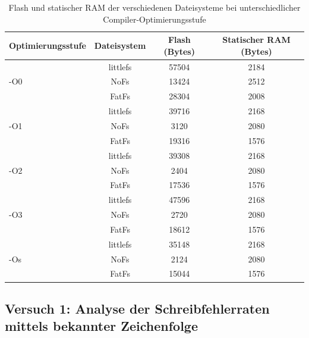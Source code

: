 \documentclass[11pt]{article}
\begin{document}
            \begin{table}[H]
                \centering
                \caption{Flash und statischer RAM der verschiedenen Dateisysteme bei unterschiedlicher Compiler-Optimierungsstufe}
                \label{tab:flash-ram}
                \begin{tabular}{|l|c|c|c|}
                \hline
                \textbf{Optimierungsstufe} & \textbf{Dateisystem} & \textbf{Flash (Bytes)} & \textbf{Statischer RAM (Bytes)} \\
                \hline
                \multirow{3}{*}{-O0} & littlefs & 57504 & 2184 \\
                                      & NoFs     & 13424 & 2512 \\
                                      & FatFs    & 28304 & 2008 \\
                \hline
                \multirow{3}{*}{-O1} & littlefs & 39716 & 2168 \\
                                      & NoFs     &  3120 & 2080 \\
                                      & FatFs    & 19316 & 1576 \\
                \hline
                \multirow{3}{*}{-O2} & littlefs & 39308 & 2168 \\
                                      & NoFs     &  2404 & 2080 \\
                                      & FatFs    & 17536 & 1576 \\
                \hline
                \multirow{3}{*}{-O3} & littlefs & 47596 & 2168 \\
                                      & NoFs     &  2720 & 2080 \\
                                      & FatFs    & 18612 & 1576 \\
                \hline
                \multirow{3}{*}{-Os} & littlefs & 35148 & 2168 \\
                                      & NoFs     &  2124 & 2080 \\
                                      & FatFs    & 15044 & 1576 \\
                \hline
                \end{tabular}
                \end{table}



\subsection{Versuch 1: Analyse der Schreibfehlerraten mittels bekannter Zeichenfolge}\label{sec:v1}
\end{document}
